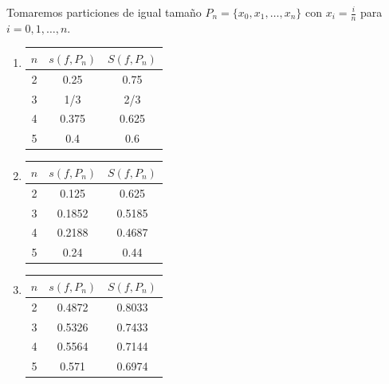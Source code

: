 \documentclass[
  a4paper,
]{scrreport}
\theoremstyle{definition}
\theoremstyle{remark}
\begin{document}
\begin{tcolorbox}[enhanced jigsaw, left=2mm, arc=.35mm, coltitle=black, toprule=.15mm, colback=white, breakable, bottomrule=.15mm, colbacktitle=quarto-callout-tip-color!10!white, bottomtitle=1mm, toptitle=1mm, opacityback=0, titlerule=0mm, opacitybacktitle=0.6, title=\textcolor{quarto-callout-tip-color}{\faLightbulb}\hspace{0.5em}{Tip}, rightrule=.15mm, leftrule=.75mm, colframe=quarto-callout-tip-color-frame]

Tomaremos particiones de igual tamaño \(P_n=\{x_0,x_1,\ldots,x_n\}\) con
\(x_i=\frac{i}{n}\) para \(i=0,1,\ldots, n\).

\begin{enumerate}
\def\labelenumi{\alph{enumi}.}
\item
  \begin{longtable}[]{@{}ccc@{}}
  \toprule()
  \(n\) & \(s(f,P_n)\) & \(S(f,P_n)\) \\
  \midrule()
  \endhead
  2 & 0.25 & 0.75 \\
  3 & 1/3 & 2/3 \\
  4 & 0.375 & 0.625 \\
  5 & 0.4 & 0.6 \\
  \bottomrule()
  \end{longtable}
\item
  \begin{longtable}[]{@{}ccc@{}}
  \toprule()
  \(n\) & \(s(f,P_n)\) & \(S(f,P_n)\) \\
  \midrule()
  \endhead
  2 & 0.125 & 0.625 \\
  3 & 0.1852 & 0.5185 \\
  4 & 0.2188 & 0.4687 \\
  5 & 0.24 & 0.44 \\
  \bottomrule()
  \end{longtable}
\item
  \begin{longtable}[]{@{}ccc@{}}
  \toprule()
  \(n\) & \(s(f,P_n)\) & \(S(f,P_n)\) \\
  \midrule()
  \endhead
  2 & 0.4872 & 0.8033 \\
  3 & 0.5326 & 0.7433 \\
  4 & 0.5564 & 0.7144 \\
  5 & 0.571 & 0.6974 \\
  \bottomrule()
  \end{longtable}
\end{enumerate}

\end{tcolorbox}
\end{document}
